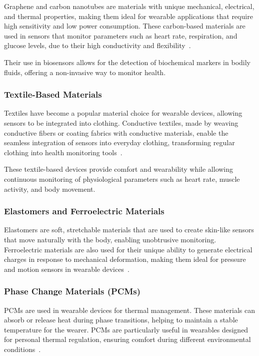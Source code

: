 \documentclass[journal]{IEEEtran}
\begin{document}
        Graphene and carbon nanotubes are materials with unique mechanical, electrical, and thermal properties, making them ideal for wearable applications that require high sensitivity and low power consumption. These carbon-based materials are used in sensors that monitor parameters such as heart rate, respiration, and glucose levels, due to their high conductivity and flexibility~\cite{Kim2017}.

        Their use in biosensors allows for the detection of biochemical markers in bodily fluids, offering a non-invasive way to monitor health.

        \subsubsection{Textile-Based Materials}

        Textiles have become a popular material choice for wearable devices, allowing sensors to be integrated into clothing. Conductive textiles, made by weaving conductive fibers or coating fabrics with conductive materials, enable the seamless integration of sensors into everyday clothing, transforming regular clothing into health monitoring tools~\cite{Song2024}.

        These textile-based devices provide comfort and wearability while allowing continuous monitoring of physiological parameters such as heart rate, muscle activity, and body movement.

        \subsubsection{Elastomers and Ferroelectric Materials}

        Elastomers are soft, stretchable materials that are used to create skin-like sensors that move naturally with the body, enabling unobtrusive monitoring. Ferroelectric materials are also used for their unique ability to generate electrical charges in response to mechanical deformation, making them ideal for pressure and motion sensors in wearable devices~\cite{Tsikriteas2021}.

        \subsubsection{Phase Change Materials (PCMs)}

        PCMs are used in wearable devices for thermal management. These materials can absorb or release heat during phase transitions, helping to maintain a stable temperature for the wearer. PCMs are particularly useful in wearables designed for personal thermal regulation, ensuring comfort during different environmental conditions~\cite{Yang2024}.
\end{document}
